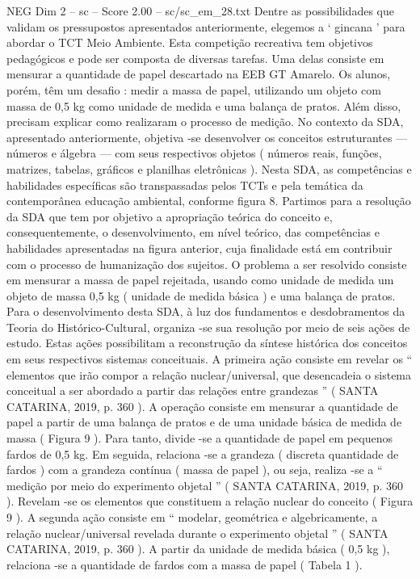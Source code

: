 \begin{textsample}{NEG Dim 2 – sc – Score 2.00 – sc/sc\_em\_28.txt}
Dentre as possibilidades que validam os pressupostos apresentados anteriormente, elegemos a ‘ gincana ’ para abordar o TCT Meio Ambiente.
Esta competição recreativa tem objetivos pedagógicos e pode ser composta de diversas tarefas.
Uma delas consiste em mensurar a quantidade de papel descartado na EEB GT Amarelo.
Os alunos, porém, têm um desafio : medir a massa de papel, utilizando um objeto com massa de 0,5 kg como unidade de medida e uma balança de pratos.
Além disso, precisam explicar como realizaram o processo de medição.
No contexto da SDA, apresentado anteriormente, objetiva -se desenvolver os conceitos estruturantes — números e álgebra — com seus respectivos objetos ( números reais, funções, matrizes, tabelas, gráficos e planilhas eletrônicas ).
Nesta SDA, as competências e habilidades específicas são transpassadas pelos TCTs e pela temática da contemporânea educação ambiental, conforme figura 8.
Partimos para a resolução da SDA que tem por objetivo a apropriação teórica do conceito e, consequentemente, o desenvolvimento, em nível teórico, das competências e habilidades apresentadas na figura anterior, cuja finalidade está em contribuir com o processo de humanização dos sujeitos.
O problema a ser resolvido consiste em mensurar a massa de papel rejeitada, usando como unidade de medida um objeto de massa 0,5 kg ( unidade de medida básica ) e uma balança de pratos.
Para o desenvolvimento desta SDA, à luz dos fundamentos e desdobramentos da Teoria do Histórico-Cultural, organiza -se sua resolução por meio de seis ações de estudo.
Estas ações possibilitam a reconstrução da síntese histórica dos conceitos em seus respectivos sistemas conceituais.
A primeira ação consiste em revelar os “ elementos que irão compor a relação nuclear/universal, que desencadeia o sistema conceitual a ser abordado a partir das relações entre grandezas ” ( SANTA CATARINA, 2019, p. 360 ).
A operação consiste em mensurar a quantidade de papel a partir de uma balança de pratos e de uma unidade básica de medida de massa ( Figura 9 ).
Para tanto, divide -se a quantidade de papel em pequenos fardos de 0,5 kg.
Em seguida, relaciona -se a grandeza ( discreta quantidade de fardos ) com a grandeza contínua ( massa de papel ), ou seja, realiza -se a “ medição por meio do experimento objetal ” ( SANTA CATARINA, 2019, p. 360 ).
Revelam -se os elementos que constituem a relação nuclear do conceito ( Figura 9 ).
A segunda ação consiste em “ modelar, geométrica e algebricamente, a relação nuclear/universal revelada durante o experimento objetal ” ( SANTA CATARINA, 2019, p. 360 ).
A partir da unidade de medida básica ( 0,5 kg ), relaciona -se a quantidade de fardos com a massa de papel ( Tabela 1 ).

\end{textsample}
